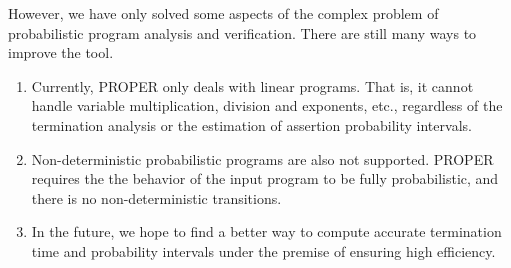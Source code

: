 \documentclass[sigconf,review, anonymous]{acmart}
\begin{document}
However, we have only solved some aspects of the complex problem of probabilistic program analysis and verification. There are still many ways to improve the tool.
\begin{enumerate}
	\item Currently, PROPER only deals with linear programs. That is, it cannot handle variable multiplication, division and exponents, etc., regardless of the termination analysis or the estimation of assertion probability intervals.
	\item Non-deterministic probabilistic programs  are also not supported. PROPER requires the the behavior of the input program to be fully probabilistic, and there is no non-deterministic transitions. 
	\item In the future, we hope to find a better way to compute accurate termination time and probability intervals under the premise of ensuring high efficiency. 
\end{enumerate}




\end{document}
